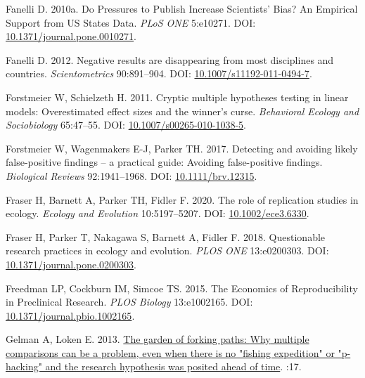 \documentclass[10pt,a4paper]{article}
\newlength{\cslhangindent}
\newlength{\cslentryspacingunit} %
\newenvironment{CSLReferences}[2] %
 {%
  \setlength{\parindent}{0pt}
  \ifodd #1
  \let\oldpar\par
  \def\par{\hangindent=\cslhangindent\oldpar}
  \fi
  \setlength{\parskip}{#2\cslentryspacingunit}
 }%
 {}
\begin{document}
\begin{CSLReferences}{1}{0}
\leavevmode{}%
Fanelli D. 2010a. Do {Pressures} to {Publish} {Increase} {Scientists}' {Bias}? {An} {Empirical} {Support} from {US} {States} {Data}. \emph{PLoS ONE} 5:e10271. DOI: \href{https://doi.org/10.1371/journal.pone.0010271}{10.1371/journal.pone.0010271}.

\leavevmode{}%
Fanelli D. 2012. Negative results are disappearing from most disciplines and countries. \emph{Scientometrics} 90:891--904. DOI: \href{https://doi.org/10.1007/s11192-011-0494-7}{10.1007/s11192-011-0494-7}.

\leavevmode{}%
Forstmeier W, Schielzeth H. 2011. Cryptic multiple hypotheses testing in linear models: Overestimated effect sizes and the winner's curse. \emph{Behavioral Ecology and Sociobiology} 65:47--55. DOI: \href{https://doi.org/10.1007/s00265-010-1038-5}{10.1007/s00265-010-1038-5}.

\leavevmode{}%
Forstmeier W, Wagenmakers E-J, Parker TH. 2017. Detecting and avoiding likely false-positive findings -- a practical guide: {Avoiding} false-positive findings. \emph{Biological Reviews} 92:1941--1968. DOI: \href{https://doi.org/10.1111/brv.12315}{10.1111/brv.12315}.

\leavevmode{}%
Fraser H, Barnett A, Parker TH, Fidler F. 2020. The role of replication studies in ecology. \emph{Ecology and Evolution} 10:5197--5207. DOI: \href{https://doi.org/10.1002/ece3.6330}{10.1002/ece3.6330}.

\leavevmode{}%
Fraser H, Parker T, Nakagawa S, Barnett A, Fidler F. 2018. Questionable research practices in ecology and evolution. \emph{PLOS ONE} 13:e0200303. DOI: \href{https://doi.org/10.1371/journal.pone.0200303}{10.1371/journal.pone.0200303}.

\leavevmode{}%
Freedman LP, Cockburn IM, Simcoe TS. 2015. The {Economics} of {Reproducibility} in {Preclinical} {Research}. \emph{PLOS Biology} 13:e1002165. DOI: \href{https://doi.org/10.1371/journal.pbio.1002165}{10.1371/journal.pbio.1002165}.

\leavevmode{}%
Gelman A, Loken E. 2013. \href{http://www.stat.columbia.edu/~gelman/research/unpublished/p_hacking.pdf}{The garden of forking paths: {Why} multiple comparisons can be a problem, even when there is no "fishing expedition" or "p-hacking" and the research hypothesis was posited ahead of time}. :17.


\end{CSLReferences}
\end{document}
